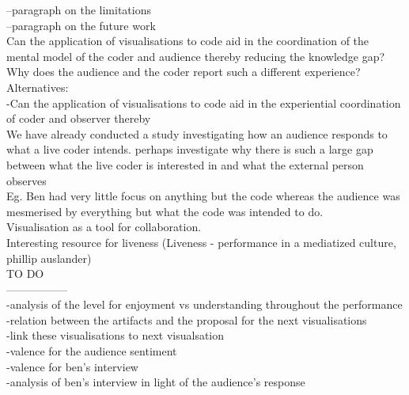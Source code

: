 \documentclass[12pt]{article}
\begin{document}
--paragraph on the limitations\\

--paragraph on the future work\\





Can the application of visualisations to code aid in the coordination of the mental model of the coder and audience thereby reducing the knowledge gap?\\

Why does the audience and the coder report such a different experience?\\

Alternatives:\\
-Can the application of visualisations to code aid in the experiential coordination of coder and observer thereby\\


We have already conducted a study investigating how an audience responds to what a live coder intends. perhaps investigate why there is such a large gap between what the live coder is interested in and what the external person observes\\

Eg. Ben had very little focus on anything but the code whereas the audience was mesmerised by everything but what the code was intended to do.\\

Visualisation as a tool for collaboration.\\


Interesting resource for liveness (Liveness - performance in a mediatized culture, phillip auslander)\\



TO DO\\
-----------------\\

-analysis of the level for enjoyment vs understanding throughout the performance\\
-relation between the artifacts and the proposal for the next visualisations\\
-link these visualisations to next visualsation\\
-valence for the audience sentiment\\
-valence for ben's interview\\
-analysis of ben's interview in light of the audience's response\\
\end{document}

